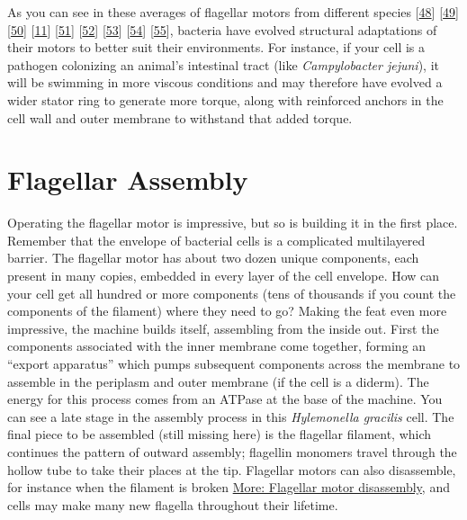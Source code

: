 \documentclass[]{tufte-book}
\begin{document}
As you can see in these averages of flagellar motors from different species {[}\protect\hyperlink{ref-murphy2006}{48}{]} {[}\protect\hyperlink{ref-chen2011}{49}{]} {[}\protect\hyperlink{ref-zhao2014}{50}{]} {[}\protect\hyperlink{ref-beeby2016}{11}{]} {[}\protect\hyperlink{ref-qin2017}{51}{]} {[}\protect\hyperlink{ref-chaban2018}{52}{]} {[}\protect\hyperlink{ref-kaplan2019}{53}{]} {[}\protect\hyperlink{ref-ferreira2019}{54}{]} {[}\protect\hyperlink{ref-chang2019}{55}{]}, bacteria have evolved structural adaptations of their motors to better suit their environments. For instance, if your cell is a pathogen colonizing an animal's intestinal tract (like \emph{Campylobacter jejuni}), it will be swimming in more viscous conditions and may therefore have evolved a wider stator ring to generate more torque, along with reinforced anchors in the cell wall and outer membrane to withstand that added torque.

\hypertarget{flagellar-assembly}{%
\section{Flagellar Assembly}\label{flagellar-assembly}}

Operating the flagellar motor is impressive, but so is building it in the first place. Remember that the envelope of bacterial cells is a complicated multilayered barrier. The flagellar motor has about two dozen unique components, each present in many copies, embedded in every layer of the cell envelope. How can your cell get all hundred or more components (tens of thousands if you count the components of the filament) where they need to go? Making the feat even more impressive, the machine builds itself, assembling from the inside out. First the components associated with the inner membrane come together, forming an ``export apparatus'' which pumps subsequent components across the membrane to assemble in the periplasm and outer membrane (if the cell is a diderm). The energy for this process comes from an ATPase at the base of the machine. You can see a late stage in the assembly process in this \emph{Hylemonella gracilis} cell. The final piece to be assembled (still missing here) is the flagellar filament, which continues the pattern of outward assembly; flagellin monomers travel through the hollow tube to take their places at the tip. Flagellar motors can also disassemble, for instance when the filament is broken \protect\hyperlink{Flagellar_motor_disassembly}{More: Flagellar motor disassembly}, and cells may make many new flagella throughout their lifetime.
\end{document}
